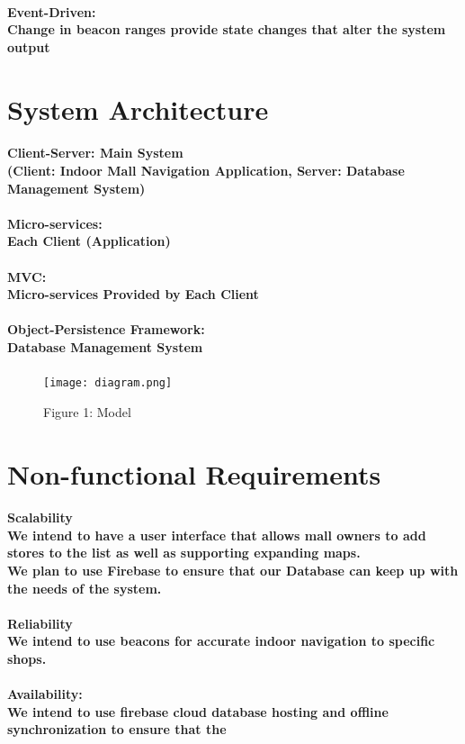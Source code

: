 \documentclass{article}
\begin{document}
	\paragraph{Event-Driven:\\ Change in beacon ranges provide state changes that alter the system output}
	
	
	\section{System Architecture}
	\paragraph{Client-Server:  Main System  \\ (Client: Indoor Mall Navigation Application, Server: Database Management System)}
	\paragraph{Micro-services: \\ Each Client (Application) }
	\paragraph{MVC: \\ Micro-services Provided by Each Client}
	\paragraph{Object-Persistence Framework: \\ Database Management System}
	
	
	\break
	\begin{figure}
		\texttt{[image: diagram.png]}
		\caption{Figure 1: Model}
	\end{figure}
	\break
	
	\section{Non-functional Requirements}
	\paragraph{Scalability \\We intend to have a user interface that allows mall owners to add stores to the list as well as supporting expanding maps. \\We plan to use Firebase to ensure that our Database can keep up with the needs of the system.}
	\paragraph{ Reliability \\ We intend to use beacons for accurate indoor navigation to specific shops.}
	\paragraph{ Availability: \\ We intend to use firebase cloud database hosting and offline synchronization to ensure that the}
	
	
	
	
	
	
\end{document}

